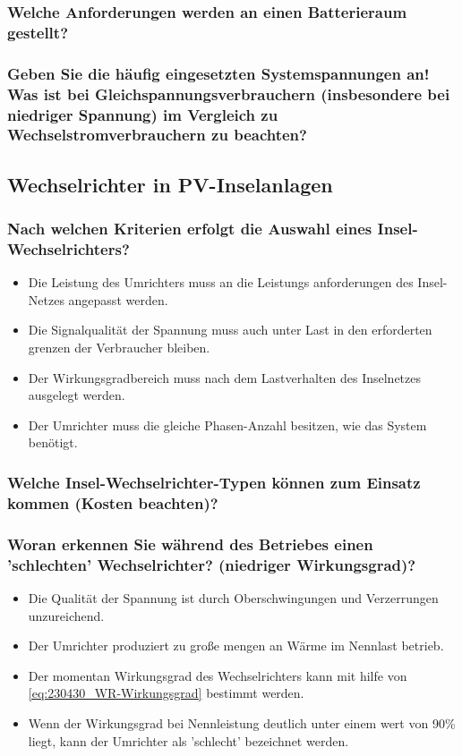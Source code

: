 \subsubsection{Welche Anforderungen werden an einen Batterieraum gestellt?}
\blindtext
\subsubsection{Geben Sie die häufig eingesetzten Systemspannungen an! Was ist bei Gleichspannungsverbrauchern (insbesondere bei niedriger Spannung) im Vergleich zu Wechselstromverbrauchern zu beachten?}
\blindtext

\subsection{Wechselrichter in PV-Inselanlagen}
\subsubsection{Nach welchen Kriterien erfolgt die Auswahl eines Insel-Wechselrichters?}
\begin{itemize}
    \item Die Leistung des Umrichters muss an die Leistungs anforderungen des Insel-Netzes angepasst werden.
    \item Die Signalqualität der Spannung muss auch unter Last in den erforderten grenzen der Verbraucher bleiben.
    \item Der Wirkungsgradbereich muss nach dem Lastverhalten des Inselnetzes ausgelegt werden.
    \item Der Umrichter muss die gleiche Phasen-Anzahl besitzen, wie das System benötigt.
\end{itemize}
\subsubsection{Welche Insel-Wechselrichter-Typen können zum Einsatz kommen (Kosten beachten)?}
\subsubsection{Woran erkennen Sie während des Betriebes einen 'schlechten' Wechselrichter? (niedriger Wirkungsgrad)?}

\begin{itemize}
    \item Die Qualität der Spannung ist durch Oberschwingungen und Verzerrungen unzureichend.
    \item Der Umrichter produziert zu große mengen an Wärme im Nennlast betrieb.
    \item Der momentan Wirkungsgrad des Wechselrichters kann mit hilfe von \autoref{eq:230430_WR-Wirkungsgrad} bestimmt werden.
    \item Wenn der Wirkungsgrad bei Nennleistung deutlich unter einem wert von 90\% liegt, kann der Umrichter als 'schlecht' bezeichnet werden.
\end{itemize}

